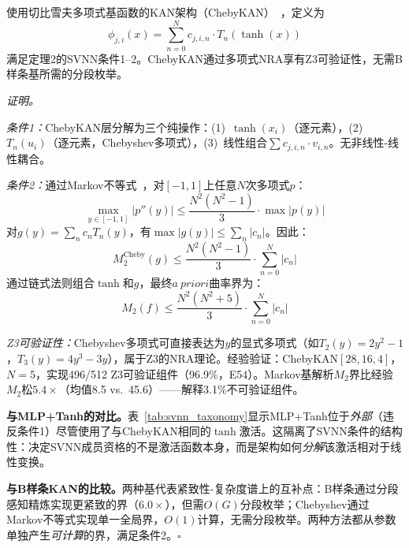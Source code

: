 \begin{proposition}[ChebyKAN是结构可验证的]
\label{prop:chebykan-svnn}
使用切比雪夫多项式基函数的KAN架构（ChebyKAN）~\cite{bozorgasl2024chebykan}，定义为
\begin{equation}
\phi_{j,i}(x) = \sum_{n=0}^{N} c_{j,i,n} \cdot T_n(\tanh(x))
\label{eq:chebykan_def}
\end{equation}
满足定理2的SVNN条件1--2。ChebyKAN通过多项式NRA享有Z3可验证性，无需B样条基所需的分段枚举。
\end{proposition}

\vspace{4pt}
\noindent\textit{证明。}

\textit{条件1：}ChebyKAN层分解为三个纯操作：(1)~$\tanh(x_i)$（逐元素），(2)~$T_n(u_i)$（逐元素，Chebyshev多项式），(3)~线性组合$\sum c_{j,i,n} \cdot v_{i,n}$。无非线性-线性耦合。

\textit{条件2：}通过Markov不等式~\cite{markov1916limit}，对$[-1,1]$上任意$N$次多项式$p$：
\begin{equation}
\max_{y\in[-1,1]} |p''(y)| \leq \frac{N^2(N^2-1)}{3} \cdot \max|p(y)|
\label{eq:markov_second}
\end{equation}
对$g(y) = \sum_n c_n T_n(y)$，有$\max|g(y)| \leq \sum_n |c_n|$。因此：
\begin{equation}
M_2^{\text{Cheby}}(g) \leq \frac{N^2(N^2-1)}{3} \cdot \sum_{n=0}^{N} |c_n|
\label{eq:cheby_m2_bound}
\end{equation}
通过链式法则组合$\tanh$和$g$，最终$a~priori$曲率界为：
\begin{equation}
M_2(f) \leq \frac{N^2(N^2+5)}{3} \cdot \sum_{n=0}^{N} |c_n|
\label{eq:cheby_final_m2}
\end{equation}

\textit{Z3可验证性：}Chebyshev多项式可直接表达为$y$的显式多项式（如$T_2(y)=2y^2-1$，$T_3(y)=4y^3-3y$），属于Z3的NRA理论。经验验证：ChebyKAN$[28,16,4]$，$N=5$，实现496/512 Z3可验证组件（96.9\%，E54）。Markov基解析$M_2$界比经验$M_2$松$5.4\times$（均值8.5 vs.\ 45.6）——解释3.1\%不可验证组件。

\textbf{与MLP+Tanh的对比。}表~\ref{tab:svnn_taxonomy}显示MLP+Tanh位于\textit{外部}（违反条件1）尽管使用了与ChebyKAN相同的$\tanh$激活。这隔离了SVNN条件的结构性：决定SVNN成员资格的不是激活函数本身，而是架构如何\textit{分解}该激活相对于线性变换。

\vspace{2pt}
\noindent\textbf{与B样条KAN的比较。}两种基代表紧致性-复杂度谱上的互补点：B样条通过分段感知精炼实现更紧致的界（$6.0\times$），但需$O(G)$分段枚举；Chebyshev通过Markov不等式实现单一全局界，$O(1)$计算，无需分段枚举。两种方法都从参数单独产生\textit{可计算}的界，满足条件2。$\square$

